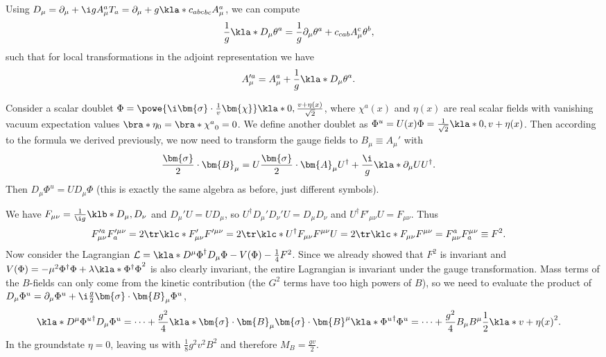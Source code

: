 \documentclass[english, parskip=full]{scrbook}
\newcommand{\example}[3]{\begin{tcolorbox}[colback=colorbackgroundexample,colframe=colorexample, breakable,enhanced,title={\textbf{#1}: #2.}]#3\end{tcolorbox}}
\begin{document}
Using $D_\mu=\partial_\mu + \i gA_\mu^a T_a = \partial_\mu + g\kla*{c_{abc}}_{bc} A_\mu^a$, we can compute
\begin{align}
\frac{1}{g} \kla*{D_\mu\theta}^a &= \frac{1}{g}\partial_\mu \theta^a + c_{cab} A_\mu^c \theta^b,
\end{align}
such that for local transformations in the adjoint representation we have
\begin{align}
A_\mu'^a &= A_\mu^a + \frac{1}{g} \kla*{D_\mu \theta}^a.
\end{align}
\example{Unitary Gauge}{Scalar Doublet}{
Consider a scalar doublet $\Phi = \powe{\i \bm{\sigma} \cdot \frac{1}{v} \bm{\chi}} \kla*{0, \frac{v+\eta(x)}{\sqrt{2}}}$, where $\chi^a(x)$ and $\eta(x)$ are real scalar fields with vanishing vacuum expectation values $\bra*{\eta}_0=\bra*{\chi^a}_0=0$.
We define another doublet as $\Phi^u = U(x)\Phi = \frac{1}{\sqrt{2}} \kla*{0, v + \eta(x)}$.
Then according to the formula we derived previously, we now need to transform the gauge fields to $B_\mu\equiv A_\mu'$ with
\begin{align}
\frac{\bm{\sigma}}{2}\cdot \bm{B}_\mu &= U \frac{\bm{\sigma}}{2}\cdot \bm{A}_\mu U^\dagger + \frac{\i}{g} \kla*{\partial_\mu U}U^\dagger.
\end{align}
Then $D_\mu\Phi^u = UD_\mu\Phi$ (this is exactly the same algebra as before, just different symbols).

We have $F_{\mu\nu}=\frac{1}{\i g}\klb*{D_\mu,D_\nu }$ and $D_\mu'U=UD_\mu$, so $U^\dagger D_\mu'D_\nu' U=D_\mu D_\nu$ and $U^\dagger F'_{\mu\nu}U=F_{\mu\nu}$.
Thus
\begin{align}
F'^a_{\mu\nu} F_a'^{\mu\nu} &= 2\tr\klc*{F'_{\mu\nu} F'^{\mu\nu}} = 2\tr\klc*{U^\dagger F_{\mu\nu} F^{\mu\nu} U} = 2\tr\klc*{F_{\mu\nu} F^{\mu\nu}} = F^a_{\mu\nu} F_a^{\mu\nu} \equiv F^2.
\end{align}
Now consider the Lagrangian $\mathcal{L} = \kla*{D^\mu \Phi}^\dagger D_\mu\Phi - V(\Phi) - \frac{1}{4}F^2$.
Since we already showed that $F^2$ is invariant and $V(\Phi)=-\mu^2\Phi^\dagger\Phi + \lambda \kla*{\Phi^\dagger \Phi}^2$ is also clearly invariant, the entire Lagrangian is invariant under the gauge transformation.
Mass terms of the $B$-fields can only come from the kinetic contribution (the $G^2$ terms have too high powers of $B$), so we need to evaluate the product of $D_\mu \Phi^u = \partial_\mu \Phi^u + \i \frac{g}{2}\bm{\sigma}\cdot\bm{B}_\mu \Phi^u$,
\begin{align}
\kla*{D^\mu \Phi^u}^\dagger D_\mu\Phi^u &= \dots + \frac{g^2}{4} \kla*{\bm{\sigma}\cdot\bm{B}_\mu }\bm{\sigma}\cdot\bm{B}^\mu \kla*{\Phi^u}^\dagger \Phi^u = \dots + \frac{g^2}{4} B_\mu B^\mu  \frac{1}{2} \kla*{v+\eta(x)}^2.
\end{align}
In the groundstate $\eta=0$, leaving us with $\frac{1}{8}g^2v^2B^2$ and therefore $M_B = \frac{gv}{2}$.
}
\end{document}
